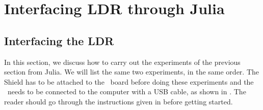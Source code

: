 \section{Interfacing LDR through Julia}
\subsection{Interfacing the LDR}
In this section, we discuss how to carry out the experiments of the
previous section from Julia.  We will list the same two experiments,
in the same order.  The Shield has to be attached to the \arduino\ board
before doing these experiments and the \arduino\ needs to be connected to the computer 
with a USB cable, as shown in .
The reader should go through the instructions given in  before getting started.


